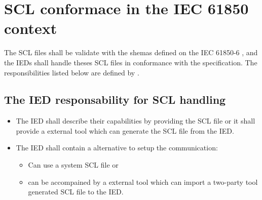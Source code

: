 \section{SCL conformace in the IEC 61850 context}

The SCL files shall be validate with the shemas defined 
on  the 
IEC 61850-6 \cite{IEC61850-6:2004} , and 
the IEDs shall handle theses SCL files 
in conformance with the specification.
The responsibilities listed below are 
defined by \cite[clause 5]{IEC61850-6:2004}. %

	\subsection{The IED responsability for SCL handling}
	\begin{itemize}
		\item 	The IED shall describe their capabilities by providing 
	 			the SCL file or it shall provide a external tool which 
	 			can generate the SCL file from the IED. 
	 	\item	The IED shall contain a alternative to setup the 
	 			communication: 
	 			
	 			\begin{itemize} 
                   \item Can use a system SCL file or 
                   \item can be accompained by a external 
                   		 tool which can import 
	 					 a two-party tool generated SCL file to the IED.
	 			 \end{itemize}
    \end{itemize}
 	 

